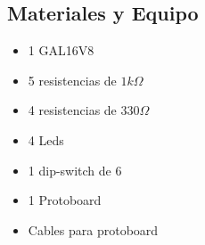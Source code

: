 \subsection{Materiales y Equipo}
\begin{multicols}{2}
\begin{itemize}
 \item 1 GAL16V8
 \item 5 resistencias de $1k \Omega$
 \item 4 resistencias de $330 \Omega$
 \item 4 Leds
 \item 1 dip-switch de 6
 \item 1 Protoboard
 \item Cables para protoboard
\end{itemize}
\end{multicols}
